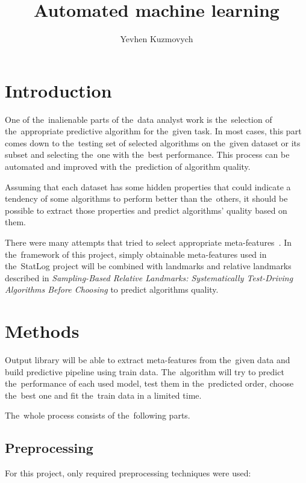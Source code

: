 \documentclass[hidelinks, english]{mvi-report}
\title{Automated machine learning}
\author{Yevhen Kuzmovych}
\affiliation{ČVUT - FIT}
\begin{document}
\maketitle

\section{Introduction}

One of the~inalienable parts of the~data analyst work is the~selection of the~appropriate predictive algorithm for
the~given task. In most cases, this part comes down to the~testing set of selected algorithms on the~given dataset or its
subset and selecting the~one with the~best performance. This process can be automated and improved with the~prediction of
algorithm quality.

Assuming that each dataset has some hidden properties that could indicate a tendency of some algorithms to perform
better than the~others, it should be possible to extract those properties and predict algorithms' quality based on them.

There were many attempts that tried to select appropriate meta-features~\cite{sampling-based-relative-landmarks,statlog,meta-learning-for-algorithm-selection}. In the~framework of
this project, simply obtainable meta-features used in the~StatLog project\cite{statlog} will be combined with landmarks
and relative landmarks described in \textit{Sampling-Based Relative Landmarks: Systematically Test-Driving Algorithms
Before Choosing}\cite{sampling-based-relative-landmarks} to predict algorithms quality.

\section{Methods}

Output library will be able to extract meta-features from the~given data and build predictive pipeline using train data.
The~algorithm will try to predict the~performance of each used model, test them in the~predicted order, choose the~best
one and fit the~train data in a limited time.

The~whole process consists of the~following parts.

\subsection{Preprocessing}
For this project, only required preprocessing techniques were used:
\end{document}
